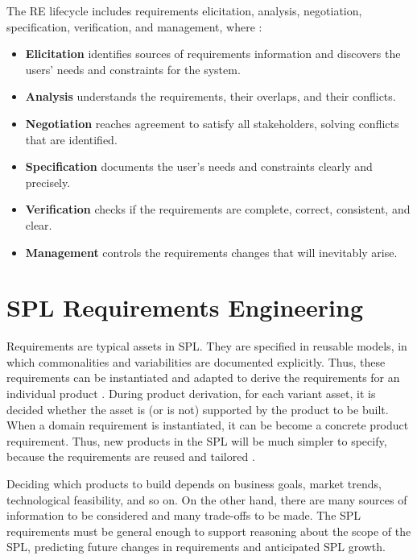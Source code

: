 The \ac{RE} lifecycle includes requirements elicitation, analysis, negotiation, specification, verification, and 
management, where \citep{clements2002software,sommerville2005integrated}:

\begin{itemize}
\item \textbf{Elicitation} identifies sources of requirements information and discovers the 
users’ needs and constraints for the system.
\item \textbf{Analysis} understands the requirements, their overlaps, and their conflicts.
\item \textbf{Negotiation} reaches agreement to satisfy all stakeholders,
solving conflicts that are identified.
\item \textbf{Specification} documents the user’s needs and constraints clearly and precisely.
\item \textbf{Verification} checks if the requirements are complete, correct, consistent, and clear.
\item \textbf{Management} controls the requirements changes that will inevitably arise.
\end{itemize}

\section{SPL Requirements Engineering}
\label{sc:splrequirementsengineering}

Requirements are typical assets in \ac{SPL}. They are specified in reusable
models, in which commonalities and variabilities are documented explicitly. Thus, these requirements 
can be instantiated and adapted to derive the requirements for an individual
product \citep{cheng2007research}.
During product derivation, for each variant asset, it is decided whether the asset is (or is not) supported by 
the product to be built. When a domain requirement is instantiated, it can be become a concrete product requirement. 
Thus, new products in the \ac{SPL} will be much simpler to specify, because the
requirements are reused and tailored \citep{clements2002software}. 

Deciding which products to build depends on business goals, market trends,
technological feasibility, and so on. On the other hand, there are many sources of information 
to be considered and many trade-offs to be made. The \ac{SPL} requirements must be general enough to support 
reasoning about the scope of the \ac{SPL}, predicting future changes in
requirements and anticipated \ac{SPL} growth.

